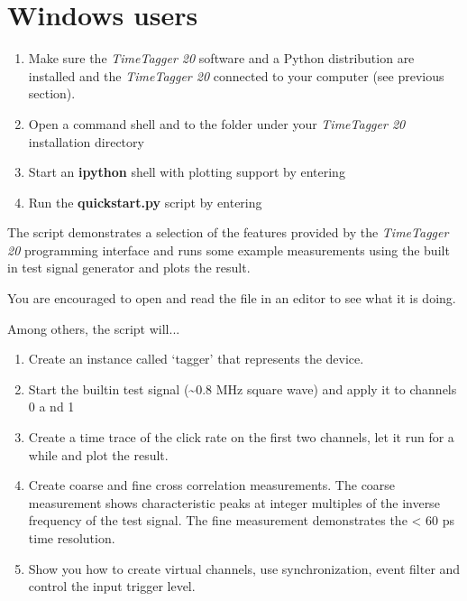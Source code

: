 \documentclass[letterpaper,10pt,english]{sphinxmanual}
\begin{document}
\section{Windows users}
\label{sections/gettingStarted:windows-users}\begin{enumerate}
\item {} 
Make sure the \emph{TimeTagger 20} software and a Python distribution are installed and the \emph{TimeTagger 20} connected to your computer (see previous section).

\item {} 
Open a command shell and  to the  folder under your \emph{TimeTagger 20} installation directory

\item {} 
Start an \textbf{ipython} shell with plotting support by entering 

\item {} 
Run the \textbf{quickstart.py} script by entering 

\end{enumerate}

The script demonstrates a selection of the features provided by the \emph{TimeTagger 20} programming interface
and runs some example measurements using the built in test signal generator and plots the result.

You are encouraged to open and read the  file in an editor to see what it is doing.

Among others, the script will...
\begin{enumerate}
\item {} 
Create an instance called `tagger' that represents the device.

\item {} 
Start the builtin test signal (\textasciitilde{}0.8 MHz square wave) and apply it to channels 0 a nd 1

\item {} 
Create a time trace of the click rate on the first two channels, let it run for a while and plot the result.

\item {} 
Create coarse and fine cross correlation measurements. The coarse measurement shows characteristic peaks at integer multiples of the inverse frequency of the test signal. The fine measurement demonstrates the \textless{} 60 ps time resolution.

\item {} 
Show you how to create virtual channels, use synchronization, event filter and control the input trigger level.

\end{enumerate}
\end{document}
